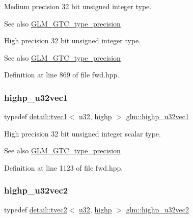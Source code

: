 Medium precision 32 bit unsigned integer type. \begin{DoxySeeAlso}{See also}
\hyperlink{group__gtc__type__precision}{G\+L\+M\+\_\+\+G\+T\+C\+\_\+type\+\_\+precision}
\end{DoxySeeAlso}
High precision 32 bit unsigned integer type. \begin{DoxySeeAlso}{See also}
\hyperlink{group__gtc__type__precision}{G\+L\+M\+\_\+\+G\+T\+C\+\_\+type\+\_\+precision} 
\end{DoxySeeAlso}


Definition at line 869 of file fwd.\+hpp.

\mbox{\label{group__gtc__type__precision_ga8a92d1f79e2fd4a03be803e35aac8e1b}} 
\subsubsection{\texorpdfstring{highp\+\_\+u32vec1}{highp\_u32vec1}}
{\footnotesize\ttfamily typedef \hyperlink{structglm_1_1detail_1_1tvec1}{detail\+::tvec1}$<$ \hyperlink{group__gtc__type__precision_ga54e837745059fd29017bed71cfa0a8db}{u32}, \hyperlink{namespaceglm_a0f04f086094c747d227af4425893f545ac6f7eab42eacbb10d59a58e95e362074}{highp} $>$ \hyperlink{group__gtc__type__precision_ga8a92d1f79e2fd4a03be803e35aac8e1b}{glm\+::highp\+\_\+u32vec1}}

High precision 32 bit unsigned integer scalar type. \begin{DoxySeeAlso}{See also}
\hyperlink{group__gtc__type__precision}{G\+L\+M\+\_\+\+G\+T\+C\+\_\+type\+\_\+precision} 
\end{DoxySeeAlso}


Definition at line 1123 of file fwd.\+hpp.

\mbox{\label{group__gtc__type__precision_gaddb81e8e12bd640e188744ed372c95bb}} 
\subsubsection{\texorpdfstring{highp\+\_\+u32vec2}{highp\_u32vec2}}
{\footnotesize\ttfamily typedef \hyperlink{structglm_1_1detail_1_1tvec2}{detail\+::tvec2}$<$ \hyperlink{group__gtc__type__precision_ga54e837745059fd29017bed71cfa0a8db}{u32}, \hyperlink{namespaceglm_a0f04f086094c747d227af4425893f545ac6f7eab42eacbb10d59a58e95e362074}{highp} $>$ \hyperlink{group__gtc__type__precision_gaddb81e8e12bd640e188744ed372c95bb}{glm\+::highp\+\_\+u32vec2}}

